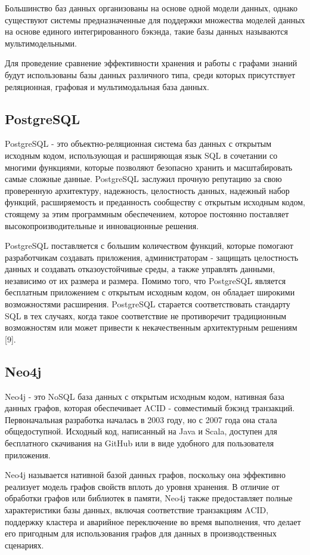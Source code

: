 Большинство баз данных организованы на основе одной модели данных, однако существуют системы предназначенные для поддержки множества
моделей данных на основе единого интегрированного бэкэнда, такие базы данных называются мультимодельными.

Для проведение сравнение эффективности хранения и работы с графами знаний будут использованы базы данных различного типа, среди которых
присутствует реляционная, графовая и мультимодальная база данных.

\subsection{PostgreSQL}

PostgreSQL - это объектно-реляционная система баз данных с открытым исходным кодом, использующая и расширяющая язык SQL в сочетании со
многими функциями, которые позволяют безопасно хранить и масштабировать самые сложные данные. PostgreSQL заслужил прочную репутацию за
свою проверенную архитектуру, надежность, целостность данных, надежный набор функций, расширяемость и преданность сообществу с открытым
исходным кодом, стоящему за этим программным обеспечением, которое постоянно поставляет высокопроизводительные и инновационные решения.

PostgreSQL поставляется с большим количеством функций, которые помогают разработчикам создавать приложения, администраторам - защищать
целостность данных и создавать отказоустойчивые среды, а также управлять данными, независимо от их размера и размера. Помимо того, что
PostgreSQL является бесплатным приложением с открытым исходным кодом, он обладает широкими возможностями расширения. PostgreSQL старается
соответствовать стандарту SQL в тех случаях, когда такое соответствие не противоречит традиционным возможностям или может привести к
некачественным архитектурным решениям [9].

\subsection{Neo4j}

Neo4j - это NoSQL база данных с открытым исходным кодом, нативная база данных графов, которая обеспечивает ACID - совместимый бэкэнд
транзакций. Первоначальная разработка началась в 2003 году, но с 2007 года она стала общедоступной. Исходный код, написанный на Java и Scala,
доступен для бесплатного скачивания на GitHub или в виде удобного для пользователя приложения.

Neo4j называется нативной базой данных графов, поскольку она эффективно реализует модель графов свойств вплоть до уровня хранения.
В отличие от обработки графов или библиотек в памяти, Neo4j также предоставляет полные характеристики базы данных, включая соответствие
транзакциям ACID, поддержку кластера и аварийное переключение во время выполнения, что делает его пригодным для использования графов для
данных в производственных сценариях.

